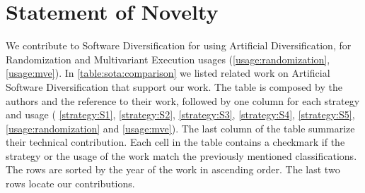 




\section{Statement of Novelty}


We contribute to Software Diversification for \wasm using Artificial Diversification, for Randomization and Multivariant Execution usages (\autoref{usage:randomization}, \autoref{usage:mve}). 
In \autoref{table:sota:comparison} we listed related work on Artificial Software Diversification that support our work. The table is composed by the authors and the reference to their work, followed by one column for each strategy and usage ( \autoref{strategy:S1},  \autoref{strategy:S2},  \autoref{strategy:S3},  \autoref{strategy:S4},  \autoref{strategy:S5}, \autoref{usage:randomization} and \autoref{usage:mve}). The last column of the table summarize their technical contribution. Each cell in the table contains a checkmark if the strategy or the usage of the work match the previously mentioned classifications. The rows are sorted by the year of the work in ascending order. The last two rows locate our contributions. 



